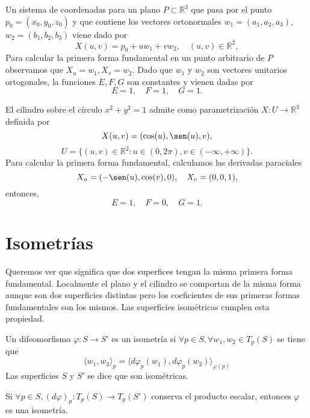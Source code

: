 \begin{ejm}
  Un sistema de coordenadas para un plano $P \subset \mathbb{R}^{3}$ que pasa por el punto $p_{0} = ( x_{0}, y_{0}, z_{0} )$ y que contiene los vectores ortonormales $w_{1} = (a_{1}, a_{2}, a_{3})$, $w_{2} = (b_{1}, b_{2}, b_{3})$ viene dado por
  \[ 
    X(u,v) = p_{0} + u w_{1} + v w_{2}, \quad (u, v) \in \mathbb{R}^{2}, 
  \] 
  Para calcular la primera forma fundamental en un punto arbitrario de $P$ observamos que $X_{u} = w_{1}, X_{v} = w_{2}$. Dado que $w_{1}$ y $w_{2}$ son vectores unitarios ortogonales, la funciones $E, F, G$ son constantes y vienen dadas por
  \[ 
    E = 1, \quad F = 1, \quad G = 1. 
  \] 
\end{ejm}

\begin{ejm}
  El cilindro sobre el círculo $x^{2} + y^{2} = 1$ admite como parametrización $X : U \to \mathbb{R}^{3}$ definida por
  \[ 
    X(u, v) = (\cos(u), \sen(u), v),
  \] 
  \[ 
    U = \{ (u, v) \in \mathbb{R}^{2} : u \in (0, 2 \pi), v \in (- \infty, + \infty) \}. 
  \] 
  Para calcular la primera forma fundamental, calculamos las derivadas paraciales
  \[ 
    X_{u} = (- \sen(u), \cos(v), 0), \quad X_{v} = (0, 0, 1),
  \] 
  entonces,
  \[ 
    E = 1, \quad F = 0, \quad G = 1. 
  \] 
\end{ejm}

\section{Isometrías}

\begin{note}
  Queremos ver que significa que dos superfices tengan la misma primera forma fundamental. Localmente el plano y el cilindro se comportan de la misma forma aunque son dos superficies distintas pero los coeficientes de sus primeras formas fundamentales son los mismos. Las superficies isométricas cumplen esta propiedad.
\end{note}

\begin{defn}
  Un difeomorfismo $\varphi : S \to S'$ es un isometría si $\forall p \in S, \forall w_{1}, w_{2} \in T_{p}(S)$ se tiene que
  \[ 
  {\langle w_{1}{ , }w_{2} \rangle}_{p} = \langle d \varphi_{p}(w_{1}){ , }d \varphi_{p}(w_{2}) \rangle_{\varphi(p)}
  \] 
  Las superficies $S$ y $S'$ se dice que son isométricas.
\end{defn}

\begin{obs}
  Si $\forall p \in S, (d \varphi)_{p} : T_{p}(S) \to T_{p}(S')$ conserva el producto escalar, entonces $\varphi$ es una isometría.
\end{obs}

